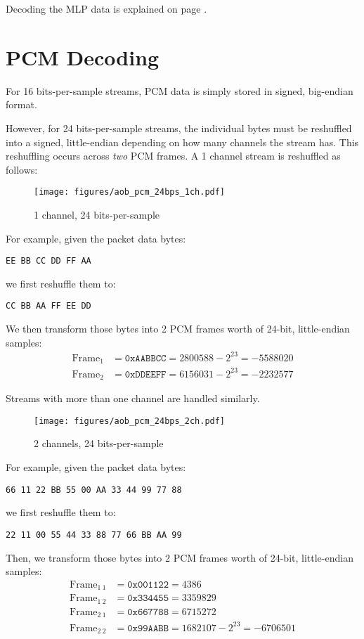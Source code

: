 Decoding the MLP data is explained on page \pageref{aob_mlp}.

\clearpage

\section{PCM Decoding}
\label{aob_pcm}

For 16 bits-per-sample streams, PCM data is simply stored in
signed, big-endian format.

However, for 24 bits-per-sample streams, the individual bytes must
be reshuffled into a signed, little-endian depending on
how many channels the stream has.
This reshuffling occurs across \textit{two} PCM frames.
A 1 channel stream is reshuffled as follows:
\begin{figure}[h]
\texttt{[image: figures/aob\_pcm\_24bps\_1ch.pdf]}
\caption{1 channel, 24 bits-per-sample}
\end{figure}
\par
\noindent
For example, given the packet data bytes:
\begin{Verbatim}
EE BB CC DD FF AA
\end{Verbatim}
\par
\noindent
we first reshuffle them to:
\begin{Verbatim}
CC BB AA FF EE DD
\end{Verbatim}
We then transform those bytes into 2 PCM frames worth of 24-bit,
little-endian samples:
\begin{align*}
\text{Frame}_1 &= \texttt{0xAABBCC} = 2800588 - 2 ^ {23} = -5588020 \\
\text{Frame}_2 &= \texttt{0xDDEEFF} = 6156031 - 2 ^ {23} = -2232577
\end{align*}

Streams with more than one channel are handled similarly.

\clearpage

\begin{figure}[h!]
\texttt{[image: figures/aob\_pcm\_24bps\_2ch.pdf]}
\caption{2 channels, 24 bits-per-sample}
\end{figure}
\par
\noindent
For example, given the packet data bytes:
\begin{Verbatim}
66 11 22 BB 55 00 AA 33 44 99 77 88
\end{Verbatim}
\par
\noindent
we first reshuffle them to:
\begin{Verbatim}
22 11 00 55 44 33 88 77 66 BB AA 99
\end{Verbatim}
\par
\noindent
Then, we transform those bytes into 2 PCM frames worth of 24-bit,
little-endian samples:
\begin{align*}
\text{Frame}_{1~1} &= \texttt{0x001122} = 4386 \\
\text{Frame}_{1~2} &= \texttt{0x334455} = 3359829 \\
\text{Frame}_{2~1} &= \texttt{0x667788} = 6715272 \\
\text{Frame}_{2~2} &= \texttt{0x99AABB} = 1682107 - 2 ^ {23} = -6706501
\end{align*}

